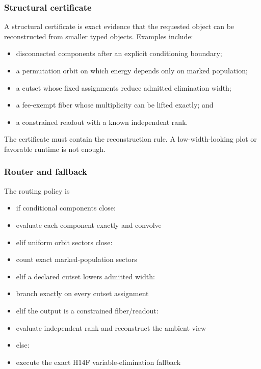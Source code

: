 \subsubsection{Structural certificate}\label{viii-ch01-structural-certificate}

A structural certificate is exact evidence that the requested object can
be reconstructed from smaller typed objects. Examples include:

\begin{itemize}
\tightlist
\item
  disconnected components after an explicit conditioning boundary;
\item
  a permutation orbit on which energy depends only on marked population;
\item
  a cutset whose fixed assignments reduce admitted elimination width;
\item
  a fee-exempt fiber whose multiplicity can be lifted exactly; and
\item
  a constrained readout with a known independent rank.
\end{itemize}

The certificate must contain the reconstruction rule. A
low-width-looking plot or favorable runtime is not enough.

\subsubsection{Router and fallback}\label{viii-ch01-router-and-fallback}

The routing policy is

\begin{itemize}
\tightlist
\item
  if conditional components close:
\item
  evaluate each component exactly and convolve
\item
  elif uniform orbit sectors close:
\item
  count exact marked-population sectors
\item
  elif a declared cutset lowers admitted width:
\item
  branch exactly on every cutset assignment
\item
  elif the output is a constrained fiber/readout:
\item
  evaluate independent rank and reconstruct the ambient view
\item
  else:
\item
  execute the exact H14F variable-elimination fallback
\end{itemize}

